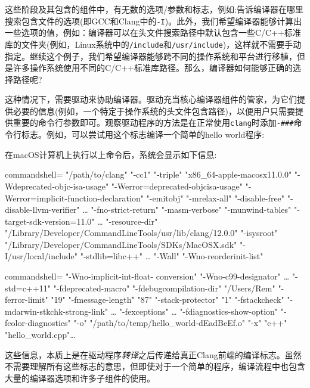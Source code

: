这些阶段及其包含的组件中，有无数的选项/参数和标志，例如:告诉编译器在哪里搜索包含文件的选项(即GCC和Clang中的\texttt{-I})。此外，我们希望编译器能够计算出一些选项的值，例如：编译器可以在头文件搜索路径中默认包含一些C/C++标准库的文件夹(例如，Linux系统中的\texttt{/include}和\texttt{/usr/include})，这样就不需要手动指定。继续这个例子，我们希望编译器能够跨不同的操作系统和平台进行移植，但是许多操作系统使用不同的C/C++标准库路径。那么，编译器如何能够正确的选择路径呢?

这种情况下，需要驱动来协助编译器。驱动充当核心编译器组件的管家，为它们提供必要的信息(例如，一个特定于操作系统的头文件包含路径)，以便用户只需要提供重要的命令行参数即可。观察驱动程序的方法是在正常使用\texttt{clang}时添加\texttt{-\#\#\#}命令行标志。例如，可以尝试用这个标志编译一个简单的hello world程序:


在macOS计算机上执行以上命令后，系统会显示如下信息:

\begin{tcblisting}{commandshell={}}
"/path/to/clang" "-cc1" "-triple" "x86_64-apple-macosx11.0.0"
"-Wdeprecated-objc-isa-usage" "-Werror=deprecated-objcisa-usage" 
"-Werror=implicit-function-declaration" "-emitobj" "-mrelax-all" 
"-disable-free" "-disable-llvm-verifier" … "-fno-strict-return" 
"-masm-verbose" "-munwind-tables"
"-target-sdk-version=11.0" … "-resource-dir"
"/Library/Developer/CommandLineTools/usr/lib/clang/12.0.0" "-isysroot"
"/Library/Developer/CommandLineTools/SDKs/MacOSX.sdk" "-I/usr/local/include" 
"-stdlib=libc++" … "-Wall" "-Wno-reorderinit-list"
\end{tcblisting}

\begin{tcblisting}{commandshell={}} "-Wno-implicit-int-float-
conversion" "-Wno-c99-designator" … "-std=c++11" "-fdeprecated-macro" 
"-fdebugcompilation-dir" "/Users/Rem" "-ferror-limit" "19" "-fmessage-length" 
"87" "-stack-protector" "1" "-fstackcheck" "-mdarwin-stkchk-strong-link" … 
"-fexceptions" … "-fdiagnostics-show-option" "-fcolor-diagnostics" "-o" 
"/path/to/temp/hello_world-dEadBeEf.o" "-x" "c++" "hello_world.cpp"…
\end{tcblisting}

这些信息，本质上是在驱动程序\textit{转译}之后传递给真正Clang前端的编译标志。虽然不需要理解所有这些标志的意思，但即使对于一个简单的程序，编译流程中也包含大量的编译器选项和许多子组件的使用。

